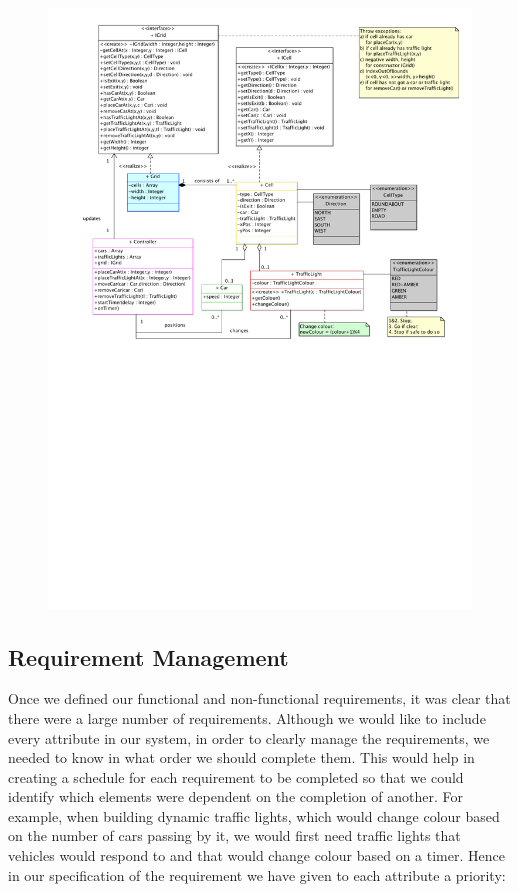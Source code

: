 \documentclass{article}
\begin{document}
\begin{figure}[H]
	\centering
	\includegraphics[scale= 0.45]{ClassDiagram}
\end{figure}

%

	
	\subsection{Requirement Management}\label{Requirement Management}

	Once we defined our functional and non-functional requirements, it was clear that there were a large number of requirements. 
	Although we would like to include every attribute in our system, in order to clearly manage the requirements, we needed to know in what order we should complete them. 
	This would help in creating a schedule for each requirement to be completed so that we could identify which elements were dependent on the completion of another. 
	For example, when building dynamic traffic lights, which would change colour based on the number of cars passing by it, we would first need traffic lights that vehicles would respond to and that would change colour based on a timer. 
	Hence in our specification of the requirement we have given to each attribute a priority:\\
	
\end{document}
